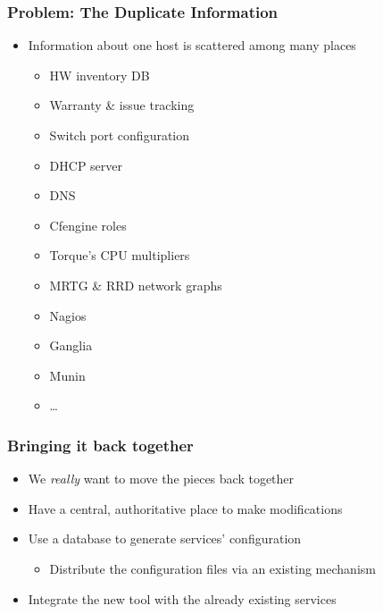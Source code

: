 \documentclass{beamer}
\begin{document}
\begin{frame}[fragile]
\frametitle{Problem: The Duplicate Information}
\begin{itemize}
    \item Information about one host is scattered among many places
        \begin{itemize}
            \item HW inventory DB
            \item Warranty \& issue tracking
            \item Switch port configuration
            \item DHCP server
            \item DNS
            \item Cfengine roles
            \item Torque's CPU multipliers
            \item MRTG \& RRD network graphs
            \item Nagios
            \item Ganglia
            \item Munin
            \item \ldots
        \end{itemize}
\end{itemize}
\end{frame}

\begin{frame}[fragile]
\frametitle{Bringing it back together}
\begin{itemize}
    \item We {\em really} want to move the pieces back together
    \item Have a central, authoritative place to make modifications
    \item Use a database to generate services' configuration
        \begin{itemize}
            \item Distribute the configuration files via an existing mechanism
        \end{itemize}
    \item Integrate the new tool with the already existing services
\end{itemize}
\end{frame}
\end{document}
